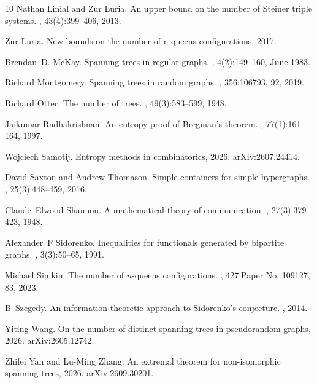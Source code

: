 \documentclass[reqno,final,a4paper]{amsart}
\numberwithin{equation}{section}
\theoremstyle{definition}
\theoremstyle{remark}
\begin{document}
\begin{thebibliography}{10}
Nathan Linial and Zur Luria.
\newblock An upper bound on the number of {S}teiner triple systems.
, 43(4):399--406, 2013.

Zur Luria.
\newblock New bounds on the number of n-queens configurations, 2017.

Brendan~D. McKay.
\newblock Spanning trees in regular graphs.
, 4(2):149--160, June 1983.

Richard Montgomery.
\newblock Spanning trees in random graphs.
, 356:106793, 92, 2019.

Richard Otter.
\newblock The number of trees.
, 49(3):583--599, 1948.

Jaikumar Radhakrishnan.
\newblock An entropy proof of {Bregman}'s theorem.
, 77(1):161--164, 1997.

Wojciech Samotij.
\newblock Entropy methods in combinatorics, 2026.
\newblock arXiv:2607.24414.

David Saxton and Andrew Thomason.
\newblock Simple containers for simple hypergraphs.
, 25(3):448--459, 2016.

Claude~Elwood Shannon.
\newblock A mathematical theory of communication.
, 27(3):379--423, 1948.

Alexander~F Sidorenko.
\newblock Inequalities for functionals generated by bipartite graphs.
, 3(3):50--65, 1991.

Michael Simkin.
\newblock The number of {$n$}-queens configurations.
, 427:Paper No. 109127, 83, 2023.

B~Szegedy.
\newblock An information theoretic approach to {S}idorenko’s conjecture.
, 2014.

Yiting Wang.
\newblock On the number of distinct spanning trees in pseudorandom graphs, 2026.
\newblock arXiv:2605.12742.

Zhifei Yan and Lu-Ming Zhang.
\newblock An extremal theorem for non-isomorphic spanning trees, 2026.
\newblock arXiv:2609.30201.

\end{thebibliography}
\end{document}
